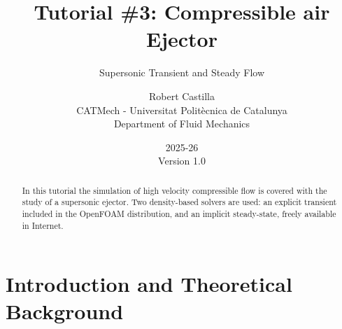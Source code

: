 \documentclass[
    parskip=half,      %
    DIV=12,            %
    headings=normal,   %
    fontsize=11pt,     %
    english            %
]{scrartcl}
\begin{document}
\title{Tutorial \#3: Compressible air Ejector}
\subtitle{Supersonic Transient and Steady Flow}
\subject{Workshop on Computational Fluid Dynamics (CFD) \\ with OpenFOAM \\ IMP-PAN Gda\'nsk}
\author{Robert Castilla \\ CATMech - Universitat Politècnica de Catalunya \\ Department of Fluid Mechanics}
\date{2025-26 \\ Version 1.0}



\maketitle

\begin{abstract}
In this tutorial the simulation of high velocity compressible flow is covered with the study 
of a supersonic ejector. Two density-based solvers are used: an explicit transient included in 
the OpenFOAM distribution, and an implicit steady-state, freely available in Internet.  
\end{abstract}

\tableofcontents
\newpage

\section{Introduction and Theoretical Background}
\end{document}
